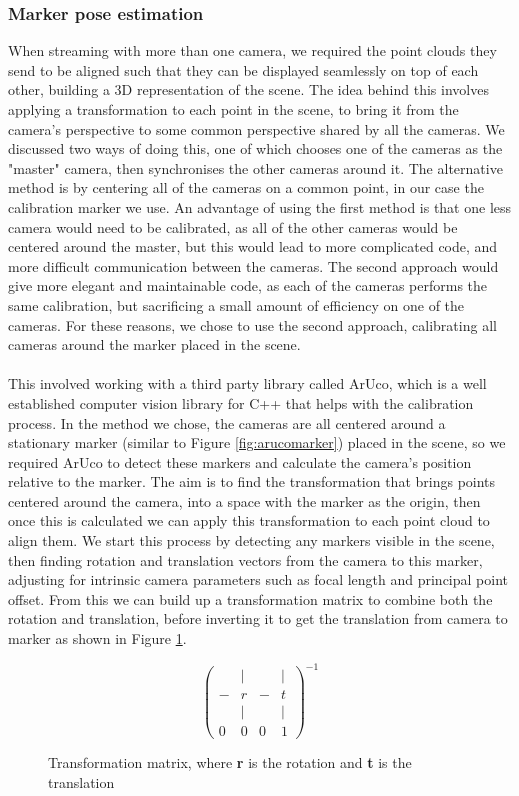 \documentclass{article}
\begin{document}
\subsubsection{Marker pose estimation}
When streaming with more than one camera, we required the point clouds they send to be aligned such that they can be displayed seamlessly on top of each other, building a 3D representation of the scene. The idea behind this involves applying a transformation to each point in the scene, to bring it from the camera's perspective to some common perspective shared by all the cameras. We discussed two ways of doing this, one of which chooses one of the cameras as the "master" camera, then synchronises the other cameras around it. The alternative method is by centering all of the cameras on a common point, in our case the calibration marker we use. An advantage of using the first method is that one less camera would need to be calibrated, as all of the other cameras would be centered around the master, but this would lead to more complicated code, and more difficult communication between the cameras. The second approach would give more elegant and maintainable code, as each of the cameras performs the same calibration, but sacrificing a small amount of efficiency on one of the cameras. For these reasons, we chose to use the second approach, calibrating all cameras around the marker placed in the scene. 
\\\\
This involved working with a third party library called ArUco, which is a well established computer vision library for C++ that helps with the calibration process. In the method we chose, the cameras are all centered around a stationary marker (similar to Figure \ref{fig:arucomarker}) placed in the scene, so we required ArUco to detect these markers and calculate the camera's position relative to the marker. The aim is to find the transformation that brings points centered around the camera, into a space with the marker as the origin, then once this is calculated we can apply this transformation to each point cloud to align them. We start this process by detecting any markers visible in the scene, then finding rotation and translation vectors from the camera to this marker, adjusting for intrinsic camera parameters such as focal length and principal point offset. From this we can build up a transformation matrix to combine both the rotation and translation, before inverting it to get the translation from camera to marker as shown in Figure \ref{fig:transformationMatrix}. \\
\begin{figure}[h]
  \[\left(\begin{array}{cccc}
      & | &   & | \\
    - & r & - & t \\ 
      & | &   & | \\
    0 & 0 & 0 & 1
    \end{array}\right)^{-1}\]
  \caption{Transformation matrix, where \textbf{r} is the rotation and \textbf{t} is the translation}
  \label{fig:transformationMatrix}
\end{figure}
\end{document}
